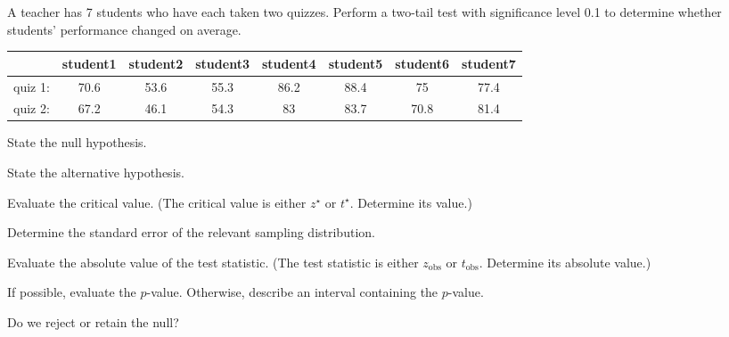 
\begin{question}
A teacher has 7 students who have each taken two quizzes. Perform a
two-tail test with significance level 0.1 to determine whether students'
performance changed on average.

\begin{longtable}[]{@{}cccccccc@{}}
\toprule
& student1 & student2 & student3 & student4 & student5 & student6 &
student7\tabularnewline
\midrule
\endhead
quiz 1: & 70.6 & 53.6 & 55.3 & 86.2 & 88.4 & 75 & 77.4\tabularnewline
quiz 2: & 67.2 & 46.1 & 54.3 & 83 & 83.7 & 70.8 & 81.4\tabularnewline
\bottomrule
\end{longtable}
\begin{answerlist}
  \item State the null hypothesis.
  \item State the alternative hypothesis.
  \item Evaluate the critical value. (The critical value is either \(z^\star\)
or \(t^\star\). Determine its value.)
  \item Determine the standard error of the relevant sampling distribution.
  \item Evaluate the absolute value of the test statistic. (The test statistic
is either \(z_\text{obs}\) or \(t_\text{obs}\). Determine its absolute
value.)
  \item If possible, evaluate the \(p\)-value. Otherwise, describe an interval
containing the \(p\)-value.
  \item Do we reject or retain the null?
\end{answerlist}
\end{question}

